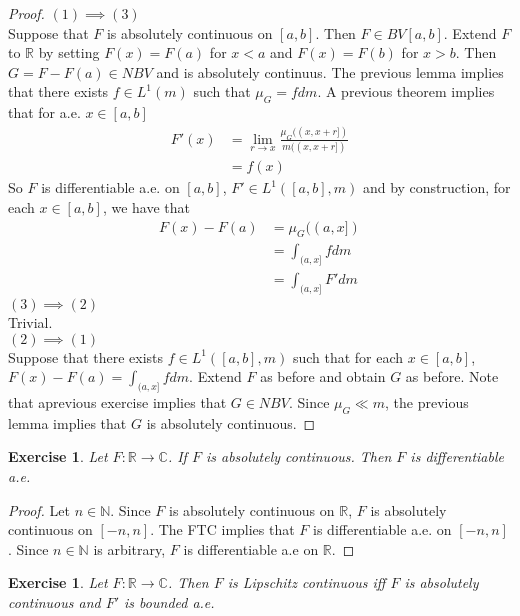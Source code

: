 \documentclass[12pt]{amsart}
\newtheorem{ex}[thm]{Exercise}
\newcommand{\C}{\mathbb{C}}
\newcommand{\N}{\mathbb{N}}
\newcommand{\R}{\mathbb{R}}
\begin{document}
\begin{proof}
$(1) \implies (3)$ \\
Suppose that $F$ is absolutely continuous on $[a,b]$. Then $F \in BV[a,b]$. Extend $F$ to $\R$ by setting $F(x) = F(a)$ for $x<a$ and $F(x)=F(b)$ for $x>b$. Then $G=F-F(a) \in NBV$ and is absolutely continuus. The previous lemma implies that there exists $f \in L^1(m)$ such that $\mu_G = fdm$. A previous theorem implies that for a.e. $x \in [a,b]$
\begin{align*}
F'(x) 
&= \lim_{r \rightarrow x} \frac{\mu_G((x,x+r])}{m((x,x+r])}\\
&= f(x)
\end{align*}  
So $F$ is differentiable a.e. on $[a,b]$, $F' \in L^1([a,b], m)$ and by construction, for each $x \in [a,b]$, we have that
\begin{align*}
F(x)-F(a)
&= \mu_G((a,x])\\
&= \int_{(a,x]}fdm\\
&= \int_{(a,x]}F'dm
\end{align*}
$(3) \implies (2)$\\
Trivial.\\
$(2) \implies (1)$\\
Suppose that there exists $f \in L^1([a,b], m)$ such that for each $x \in [a,b]$, $F(x)-F(a)=\int_{(a,x]}fdm$. Extend $F$ as before and obtain $G$ as before. Note that aprevious exercise implies that $G \in NBV$. Since $\mu_G \ll m$, the previous lemma implies that $G$ is absolutely continuous.
\end{proof}

\begin{ex}
Let $F: \R \rightarrow \C$. If $F$ is absolutely continuous. Then $F$ is differentiable a.e.
\end{ex}

\begin{proof}
Let $n \in \N$. Since $F$ is absolutely continuous on $\R$, $F$ is absolutely continuous on $[-n,n]$. The FTC implies that $F$ is differentiable a.e. on $[-n,n]$. Since $n \in \N$ is arbitrary, $F$ is differentiable a.e on $\R$.
\end{proof}

\begin{ex}
Let $F: \R \rightarrow \C$. Then $F$ is Lipschitz continuous iff $F$ is absolutely continuous and $F'$ is bounded a.e.
\end{ex}
\end{document}
